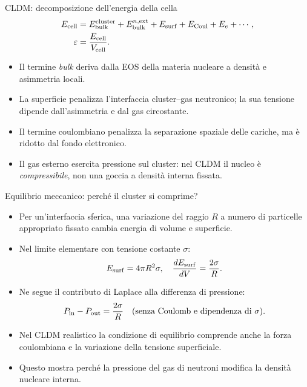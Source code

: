 \begin{frame}[t]{CLDM: decomposizione dell'energia della cella}
\small
\begin{align*}
E_{\rm cell}&=E_{\rm bulk}^{\rm cluster}+E_{\rm bulk}^{n,\rm ext}
+E_{\rm surf}+E_{\rm Coul}+E_e+\cdots,\\
\varepsilon&=\frac{E_{\rm cell}}{V_{\rm cell}}.
\end{align*}
\begin{itemize}
\item Il termine \emph{bulk} deriva dalla EOS della materia nucleare a densità e asimmetria locali.
\item La superficie penalizza l'interfaccia cluster--gas neutronico; la sua tensione dipende dall'asimmetria e dal gas circostante.
\item Il termine coulombiano penalizza la separazione spaziale delle cariche, ma è ridotto dal fondo elettronico.
\item Il gas esterno esercita pressione sul cluster: nel CLDM il nucleo è \emph{compressibile}, non una goccia a densità interna fissata.
\end{itemize}
\end{frame}

\begin{frame}[t]{Equilibrio meccanico: perché il cluster si comprime?}
\small
\begin{itemize}
\item Per un'interfaccia sferica, una variazione del raggio \(R\) a numero di particelle appropriato fissato cambia energia di volume e superficie.
\item Nel limite elementare con tensione costante \(\sigma\):
\[
E_{\rm surf}=4\pi R^2\sigma,\quad
\frac{dE_{\rm surf}}{dV}=\frac{2\sigma}{R}.
\]
\item Ne segue il contributo di Laplace alla differenza di pressione:
\[
P_{\rm in}-P_{\rm out}=\frac{2\sigma}{R}
\quad\text{(senza Coulomb e dipendenza di \(\sigma\)).}
\]
\item Nel CLDM realistico la condizione di equilibrio comprende anche la forza coulombiana e la variazione della tensione superficiale.
\item Questo mostra perché la pressione del gas di neutroni modifica la densità nucleare interna.
\end{itemize}
\end{frame}

